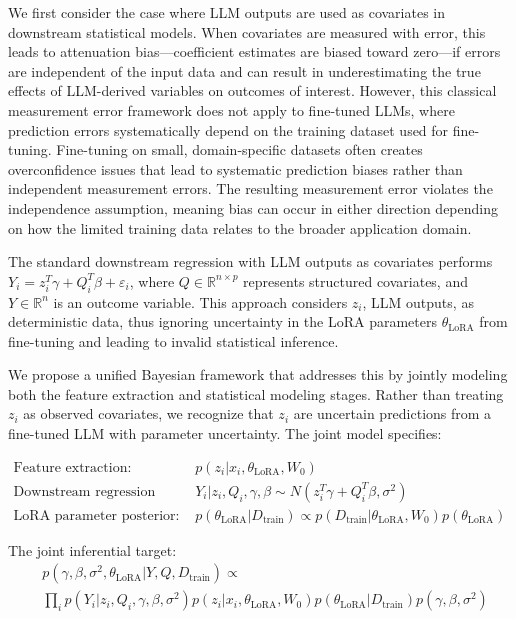 \documentclass[11pt]{article}
\begin{document}
We first consider the case where LLM outputs are used as covariates in downstream statistical models. 
When covariates are measured with error, this leads to attenuation bias—coefficient estimates are biased toward zero—if errors are independent of the input data and can result in underestimating the true effects of LLM-derived variables on outcomes of interest. 
However, this classical measurement error framework does not apply to fine-tuned LLMs, 
where prediction errors systematically depend on the training dataset used for fine-tuning. 
Fine-tuning on small, domain-specific datasets often creates overconfidence issues that lead to systematic prediction biases rather than 
independent measurement errors.
The resulting measurement error violates the independence assumption, 
meaning bias can occur in either direction depending on how the limited training data relates to the broader application domain.

The standard downstream regression with LLM outputs as covariates performs $Y_i = z_i^T\gamma + Q_i^T\beta + \varepsilon_i$, where $Q \in \mathbb{R}^{n \times p}$ represents structured covariates, and $Y \in \mathbb{R}^n$ is an outcome variable. This approach considers $z_i$, LLM outputs, as deterministic data, thus ignoring uncertainty in the LoRA parameters $\theta_{\text{LoRA}}$ from fine-tuning and leading to invalid statistical inference.

We propose a unified Bayesian framework that addresses this by jointly modeling both the feature extraction and statistical modeling stages. Rather than treating $z_i$ as observed covariates, we recognize that $z_i$ are uncertain predictions from a fine-tuned LLM with parameter uncertainty. The joint model specifies:

\begin{align}
\text{Feature extraction:} \quad &p(z_i|x_i, \theta_{\text{LoRA}}, W_0) \label{eq:feature_extraction} \\
\text{Downstream regression model:} \quad &Y_i|z_i, Q_i, \gamma, \beta \sim N(z_i^T\gamma + Q_i^T\beta, \sigma^2) \label{eq:regression_model} \\
\text{LoRA parameter posterior:} \quad &p(\theta_{\text{LoRA}}|D_{\text{train}}) \propto p(D_{\text{train}}|\theta_{\text{LoRA}}, W_0)p(\theta_{\text{LoRA}}) \label{eq:lora_posterior}
\end{align}

The joint inferential target:
\begin{align}
&p(\gamma, \beta, \sigma^2, \theta_{\text{LoRA}}|Y, Q, D_{\text{train}}) \propto \label{eq:joint_target} \\
&\prod_i p(Y_i|z_i, Q_i, \gamma, \beta, \sigma^2)p(z_i|x_i, \theta_{\text{LoRA}}, W_0)p(\theta_{\text{LoRA}}|D_{\text{train}})p(\gamma, \beta, \sigma^2) \nonumber
\end{align}
\end{document}
